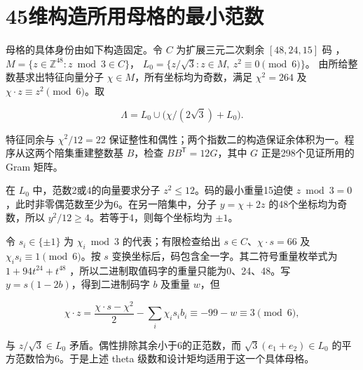 \section{45维构造所用母格的最小范数}
\label{app:ambient}


母格的具体身份由如下构造固定。令 \(C\) 为扩展三元二次剩余 \([48,24,15]\)
码 \cite{nebe}， \(M=\{z\in\mathbb Z^{48}:z\bmod3\in C\}\)，
\(L_0=\{z/\sqrt3:z\in M,\ z^2\equiv0\pmod6\}\)。
由所给整数基求出特征向量分子 \(\chi\in M\)，所有坐标均为奇数，满足
\(\chi^2=264\) 及 \(\chi\cdot z\equiv z^2\pmod6\)。取

\[
\Lambda=L_0\cup\bigl(\chi/(2\sqrt3)+L_0\bigr).
\]

特征同余与 \(\chi^2/12=22\)
保证整性和偶性；两个指数二的构造保证余体积为一。程序从这两个陪集重建整数基
\(B\)，检查 \(BB^{\mathsf T}=12G\)，其中 \(G\) 正是298个见证所用的 Gram
矩阵。

在 \(L_0\) 中，范数2或4的向量要求分子 \(z^2\le12\)。码的最小重量15迫使
\(z\bmod3=0\)，此时非零偶范数至少为6。在另一陪集中，分子 \(y=\chi+2z\)
的48个坐标均为奇数，所以 \(y^2/12\ge4\)。若等于4，则每个坐标均为
\(\pm1\)。

令 \(s_i\in\{\pm1\}\) 为 \(\chi_i\bmod3\) 的代表；有限检查给出
\(s\in C\)、\(\chi\cdot s=66\) 及 \(\chi_i s_i\equiv1\pmod6\)。按 \(s\)
变换坐标后，码包含全一字。其二符号重量枚举式为 \(1+94t^{24}+t^{48}\)
\cite[equation (20)]{munemasa-tamura}，所以二进制取值码字的重量只能为0、24、48。写
\(y=s(1-2b)\)，得到二进制码字 \(b\) 及重量 \(w\)，但

\[
\chi\cdot z
=\frac{\chi\cdot s-\chi^2}{2}-\sum_i\chi_i s_i b_i
\equiv-99-w\equiv3\pmod6,
\]

与 \(z/\sqrt3\in L_0\) 矛盾。偶性排除其余小于6的正范数，而
\(\sqrt3(e_1+e_2)\in L_0\) 的平方范数恰为6。于是上述 theta
级数和设计矩均适用于这一个具体母格。
